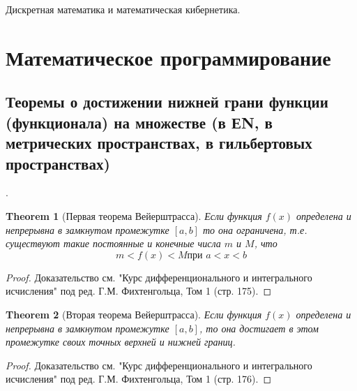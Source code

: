 \documentclass[12pt, russian]{article}
\newtheorem{theorem}{Theorem}
\begin{document}
    \begin{center}
        Дискретная математика и математическая кибернетика.
    \end{center}
    
    \section{Математическое программирование}
    \subsection{Теоремы о достижении нижней грани функции (функционала) на множестве (в ЕN, в метрических пространствах, в гильбертовых пространствах)}.
        
        \begin{theorem}[Первая теорема Вейерштрасса] Если функция $f(x)$ определена и непрерывна в замкнутом промежутке $[a,b]$ то она ограничена, т.е. существуют такие постоянные и конечные числа $m$ и $M$, что
        \begin{equation}
            m < f(x) < M \text{при } a < x < b
        \end{equation}
        \end{theorem}
        \begin{proof}
            Доказательство см. "Курс дифференционального и интегрального исчисления" под ред. Г.М. Фихтенгольца, Том 1 (стр. 175).
        \end{proof}
        
        \begin{theorem}[Вторая теорема Вейерштрасса] Если функция $f(x)$ определена и непрерывна в замкнутом промежутке $[a,b]$, то она достигает в этом промежутке своих точных верхней и нижней границ.
        \end{theorem}
        \begin{proof}
            Доказательство см. "Курс дифференционального и интегрального исчисления" под ред. Г.М. Фихтенгольца, Том 1 (стр. 176).
        \end{proof}
    
\end{document}
